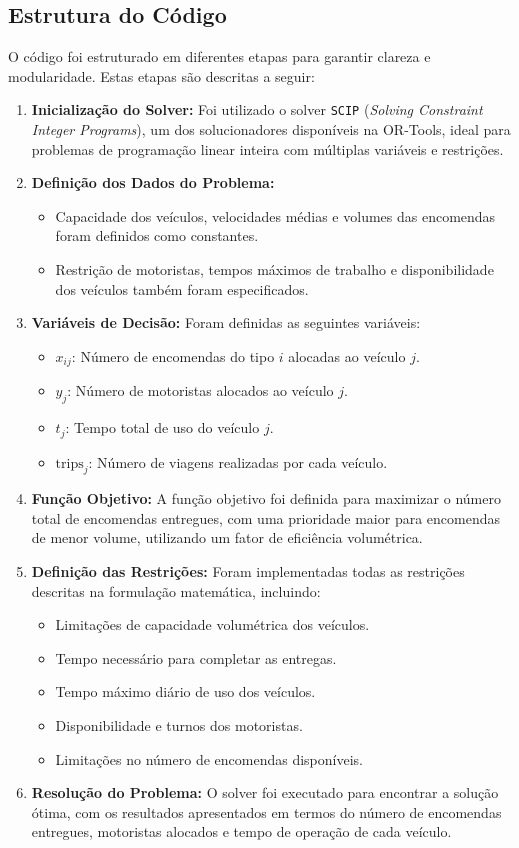 \subsection{Estrutura do Código}\label{subsec:estrutura-do-codigo}
O código foi estruturado em diferentes etapas para garantir clareza e modularidade. Estas etapas são descritas a seguir:
\begin{enumerate}
    \item \textbf{Inicialização do Solver:} Foi utilizado o solver \texttt{SCIP} (\textit{Solving Constraint Integer Programs}), um dos solucionadores disponíveis na OR-Tools, ideal para problemas de programação linear inteira com múltiplas variáveis e restrições.
    \item \textbf{Definição dos Dados do Problema:}
    \begin{itemize}
        \item Capacidade dos veículos, velocidades médias e volumes das encomendas foram definidos como constantes.
        \item Restrição de motoristas, tempos máximos de trabalho e disponibilidade dos veículos também foram especificados.
    \end{itemize}
    \item \textbf{Variáveis de Decisão:} Foram definidas as seguintes variáveis:
    \begin{itemize}
        \item \( x_{ij} \): Número de encomendas do tipo \( i \) alocadas ao veículo \( j \).
        \item \( y_j \): Número de motoristas alocados ao veículo \( j \).
        \item \( t_j \): Tempo total de uso do veículo \( j \).
        \item \( \text{trips}_j \): Número de viagens realizadas por cada veículo.
    \end{itemize}
    \item \textbf{Função Objetivo:} A função objetivo foi definida para maximizar o número total de encomendas entregues, com uma prioridade maior para encomendas de menor volume, utilizando um fator de eficiência volumétrica.
    \item \textbf{Definição das Restrições:} Foram implementadas todas as restrições descritas na formulação matemática, incluindo:
    \begin{itemize}
        \item Limitações de capacidade volumétrica dos veículos.
        \item Tempo necessário para completar as entregas.
        \item Tempo máximo diário de uso dos veículos.
        \item Disponibilidade e turnos dos motoristas.
        \item Limitações no número de encomendas disponíveis.
    \end{itemize}
    \item \textbf{Resolução do Problema:} O solver foi executado para encontrar a solução ótima, com os resultados apresentados em termos do número de encomendas entregues, motoristas alocados e tempo de operação de cada veículo.
\end{enumerate}

